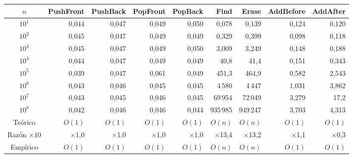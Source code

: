 \begin{tabular}{crrrrrrrr}
\toprule
$n$ & \textbf{PushFront} & \textbf{PushBack} & \textbf{PopFront} & \textbf{PopBack} & \textbf{Find} & \textbf{Erase} & \textbf{AddBefore} & \textbf{AddAfter} \\
\midrule
$10^{1}$ & 0{,}044 & 0{,}047 & 0{,}049 & 0{,}050 & 0{,}078 & 0{,}139 & 0{,}124 & 0{,}120 \\
$10^{2}$ & 0{,}045 & 0{,}047 & 0{,}049 & 0{,}049 & 0{,}329 & 0{,}399 & 0{,}098 & 0{,}118 \\
$10^{3}$ & 0{,}045 & 0{,}047 & 0{,}049 & 0{,}050 & 3{,}009 & 3{,}249 & 0{,}148 & 0{,}188 \\
$10^{4}$ & 0{,}044 & 0{,}047 & 0{,}049 & 0{,}049 & 40{,}8 & 41{,}4 & 0{,}151 & 0{,}343 \\
$10^{5}$ & 0{,}039 & 0{,}047 & 0{,}061 & 0{,}049 & 451{,}3 & 464{,}9 & 0{,}582 & 2{,}543 \\
$10^{6}$ & 0{,}043 & 0{,}046 & 0{,}045 & 0{,}045 & 4\,580 & 4\,447 & 1{,}031 & 3{,}862 \\
$10^{7}$ & 0{,}043 & 0{,}045 & 0{,}046 & 0{,}045 & 69\,954 & 72\,049 & 3{,}279 & 17{,}2 \\
$10^{8}$ & 0{,}042 & 0{,}046 & 0{,}046 & 0{,}044 & 935\,985 & 949\,247 & 3{,}703 & 4{,}313 \\
\midrule
Teórico & $O(1)$ & $O(1)$ & $O(1)$ & $O(1)$ & $O(n)$ & $O(n)$ & $O(1)$ & $O(1)$ \\
Razón $\times 10$ & $\times$1{,}0 & $\times$1{,}0 & $\times$1{,}0 & $\times$1{,}0 & $\times$13{,}4 & $\times$13{,}2 & $\times$1{,}1 & $\times$0{,}3 \\
Empírico & $O(1)$ & $O(1)$ & $O(1)$ & $O(1)$ & $O(n)$ & $O(n)$ & $O(1)$ & $O(1)$ \\
\bottomrule
\end{tabular}